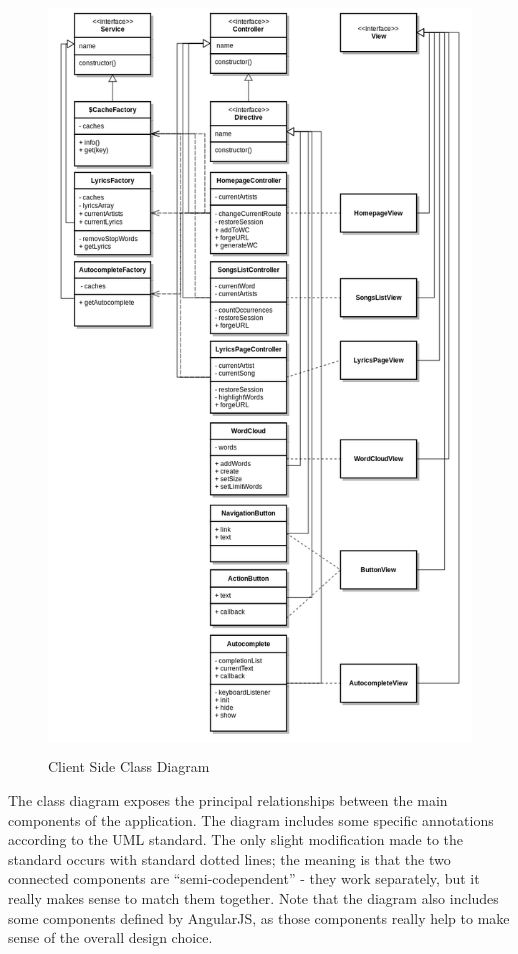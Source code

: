 \documentclass[]{article}
\begin{document}
\begin{figure}[htbp]
\centering
\includegraphics[width=20cm,height=20cm,keepaspectratio]{js_class_design.png}
\caption{Client Side Class Diagram}
\end{figure}

The class diagram exposes the principal relationships between the main
components of the application. The diagram includes some specific
annotations according to the UML standard. The only slight modification
made to the standard occurs with standard dotted lines; the meaning is
that the two connected components are ``semi-codependent'' - they work
separately, but it really makes sense to match them together. Note that
the diagram also includes some components defined by AngularJS, as those
components really help to make sense of the overall design choice.
\end{document}
